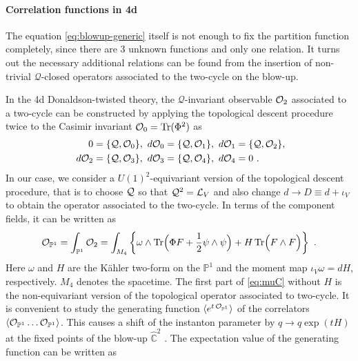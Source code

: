 \documentclass[letterpaper, 11pt]{article}
\def\IC{\mathbb{C}}
\def\IP{\mathbb{P}}
\def\CL{{\cal L}}
\def\CO{{\cal O}}
\def\CQ{{\cal Q}}
\def\half{\frac{1}{2}}
\begin{document}
\paragraph{Correlation functions in 4d}

The equation \eqref{eq:blowup-generic} itself is not enough to fix the partition function completely, since there are 3 unknown functions and only one relation. It turns out the necessary additional relations can be found from the insertion of non-trivial $\mathcal{Q}$-closed operators \cite{Nakajima:2003pg,Nakajima:2005fg} associated to the two-cycle on the blow-up. 

In the 4d Donaldson-twisted theory, the $\mathcal{Q}$-invariant observable $\CO_2$ associated to a two-cycle can be constructed by applying the topological descent procedure twice to the Casimir invariant $\CO_0 = \text{Tr}(\Phi^2)$ as \cite{Witten:1988ze}
\begin{align}
\begin{split}
0 &= \{ \CQ, \CO_0 \}, 
~ d\CO_0 = \{\CQ, \CO_1 \}, 
~ d\CO_1 = \{\CQ, \CO_2 \}, \\
~ d\CO_2 &= \{\CQ, \CO_3 \}, 
~ d\CO_3 = \{\CQ, \CO_4 \}, 
~ d\CO_4 = 0 \ . 
\end{split}
\end{align} 
In our case, we consider a $U(1)^2$-equivariant version of the topological descent procedure, that is to choose $\CQ$ so that $\CQ^2 = \CL_V$ and also change $d \to D \equiv d + \iota_V$ to obtain the operator associated to the two-cycle. In terms of the component fields, it can be written as \cite{Bershtein:2015xfa}
\begin{align} \label{eq:muC}
  {\CO}_{\IP^1} = \int_{\IP^1} \CO_2 = \int_{M_4} \left\{ \omega \wedge \text{Tr}\Big(\Phi F + \half \psi \wedge \psi\Big) + H\, \text{Tr}\Big( F \wedge F \Big) \right\}  \ .
\end{align} 
Here $\omega$ and $H$ are the K\"ahler two-form on the $\IP^1$ and the moment map $\iota_V \omega = dH$, respectively. $M_4$ denotes the spacetime. The first part of \eqref{eq:muC} without $H$ is the non-equivariant version of the topological operator associated to two-cycle. 
It is convenient to study the generating function $\langle e^{t \, {\CO}_{\IP^1}}\rangle $ of the correlators $\langle {\CO}_{\IP^1} \ldots {\CO}_{\IP^1} \rangle$. 
This causes a shift of the instanton parameter by $q \to q \exp(t H)$ at the fixed points of the blow-up $\hat{\IC}^2$ \cite{Nakajima:2003pg,Nakajima:2003uh, Nakajima:2005fg}.  
The expectation value of the generating function can be written as
\end{document}
